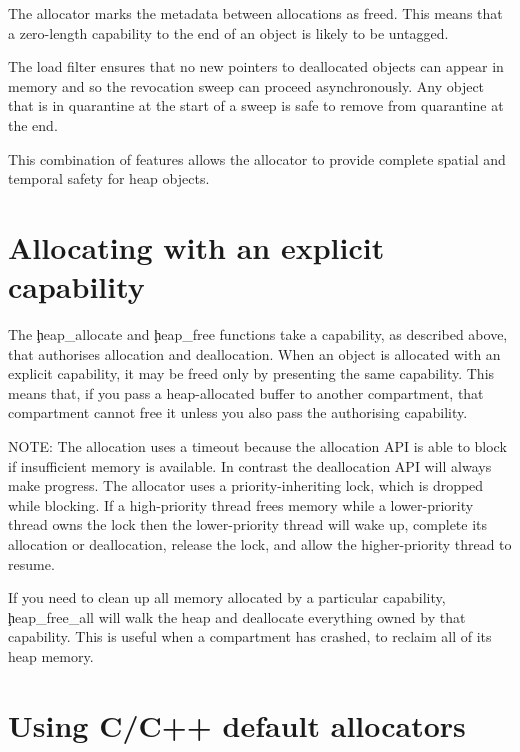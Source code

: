 \begin{note}
The allocator marks the metadata between allocations as freed.
This means that a zero-length capability to the end of an object is likely to be untagged.
\end{note}

The load filter ensures that no new pointers to deallocated objects can appear in memory and so the revocation sweep can proceed asynchronously.
Any object that is in quarantine at the start of a sweep is safe to remove from quarantine at the end.

This combination of features allows the allocator to provide complete spatial and temporal safety for heap objects.

\section{Allocating with an explicit capability}



The \c{heap_allocate} and \c{heap_free} functions take a capability, as described above, that authorises allocation and deallocation.
When an object is allocated with an explicit capability, it may be freed only by presenting the same capability.
This means that, if you pass a heap-allocated buffer to another compartment, that compartment cannot free it unless you also pass the authorising capability.

NOTE: The allocation uses a timeout because the allocation API is able to block if insufficient memory is available.
In contrast the deallocation API will always make progress.
The allocator uses a priority-inheriting lock, which is dropped while blocking.
If a high-priority thread frees memory while a lower-priority thread owns the lock then the lower-priority thread will wake up, complete its allocation or deallocation, release the lock, and allow the higher-priority thread to resume.

If you need to clean up all memory allocated by a particular capability, \c{heap_free_all} will walk the heap and deallocate everything owned by that capability.
This is useful when a compartment has crashed, to reclaim all of its heap memory.


\section{Using C/C++ default allocators}

